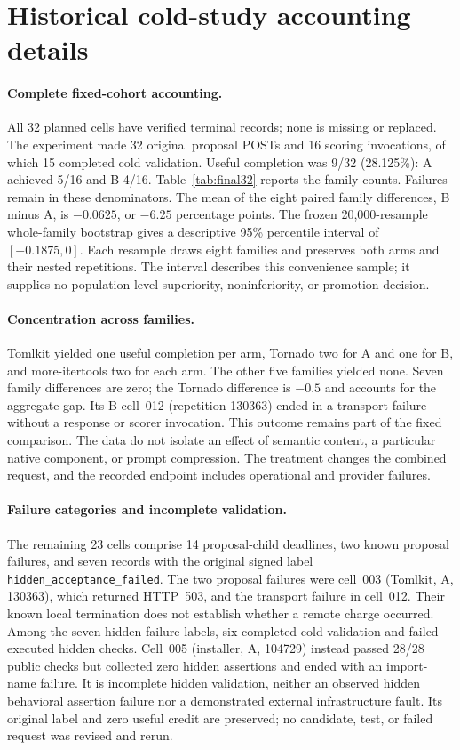 \section{Historical cold-study accounting details}
\label{sec:historical-accounting}

\paragraph{Complete fixed-cohort accounting.}
All 32 planned cells have verified terminal records; none is missing or replaced.
The experiment made 32 original proposal POSTs and 16 scoring invocations,
of which 15 completed cold validation. Useful completion was 9/32 (28.125\%):
A achieved 5/16 and B 4/16. Table~\ref{tab:final32} reports the family counts.
Failures remain in these denominators. The mean of the eight paired family
differences, B minus A, is $-0.0625$, or $-6.25$ percentage points. The frozen
20,000-resample whole-family bootstrap gives a descriptive 95\% percentile
interval of $[-0.1875,0]$. Each resample draws eight families and preserves both
arms and their nested repetitions. The interval describes this convenience
sample; it supplies no population-level superiority, noninferiority, or
promotion decision.

\paragraph{Concentration across families.}
Tomlkit yielded one useful completion per arm, Tornado two for A and one for B,
and more-itertools two for each arm. The other five families yielded none.
Seven family differences are zero; the Tornado difference is $-0.5$ and
accounts for the aggregate gap. Its B cell~012 (repetition 130363) ended in a
transport failure without a response or scorer invocation. This outcome remains
part of the fixed comparison. The data do not isolate an effect of semantic
content, a particular native component, or prompt compression. The treatment
changes the combined request, and the recorded endpoint includes operational
and provider failures.

\paragraph{Failure categories and incomplete validation.}
The remaining 23 cells comprise 14 proposal-child deadlines, two known proposal
failures, and seven records with the original signed label
\texttt{hidden\_acceptance\_failed}. The two proposal failures were cell~003
(Tomlkit, A, 130363), which returned HTTP~503, and the transport failure in
cell~012. Their known local termination does not establish whether a remote
charge occurred. Among the seven hidden-failure labels, six completed cold
validation and failed executed hidden checks. Cell~005 (installer, A, 104729)
instead passed 28/28 public checks but collected zero hidden assertions and
ended with an import-name failure. It is incomplete hidden validation, neither
an observed hidden behavioral assertion failure nor a demonstrated external
infrastructure fault. Its original label and zero useful credit are preserved;
no candidate, test, or failed request was revised and rerun.

